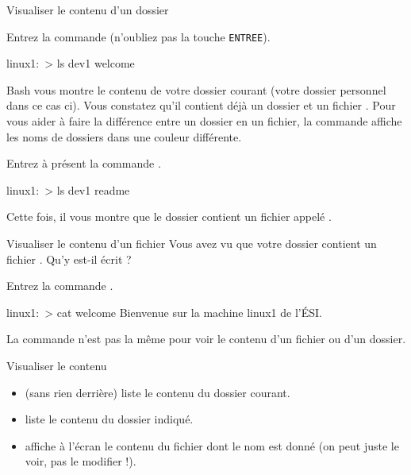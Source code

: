 \documentclass[a4paper,11pt]{style-esi/td}
\begin{document}
		\begin{Experience}{Visualiser le contenu d'un dossier}
			\vspace{-1em}
			\begin{steps}
			\item 
				Entrez la commande  (n'oubliez pas la touche \verb|ENTREE|).				
				\begin{Console}
					linux1:~> ls
					dev1 welcome
				\end{Console}				
				Bash vous montre le contenu de votre dossier courant
				(votre dossier personnel dans ce cas ci).
				Vous constatez qu'il contient déjà un dossier 
				et un fichier .
				Pour vous aider à faire la différence
				entre un dossier en un fichier, 
				la commande 
				affiche les noms de dossiers dans une couleur différente.
			\item 
				Entrez à présent la commande .
				\begin{Console}
					linux1:~> ls dev1
					readme
				\end{Console}				
				Cette fois, il vous montre que le dossier  contient
				un fichier appelé .
			\end{steps}			
		\end{Experience}

\newpage

		\begin{Experience}{Visualiser le contenu d'un fichier}
			Vous avez vu que votre dossier contient un fichier \samp{welcome}.
			Qu'y est-il écrit ?
			\begin{steps}
			\item 
				Entrez la commande \kbd{cat welcome}.
				\begin{Console}
					linux1:~> cat welcome
					Bienvenue sur la machine linux1 de l'ÉSI.
				\end{Console}
				La commande n'est pas la même pour voir le contenu d'un fichier
				ou d'un dossier.
			\end{steps}			
		\end{Experience}

		\bigskip
		\begin{theorie}{Visualiser le contenu}
			\begin{itemize}
			\item {}
				(sans rien derrière) liste le contenu du dossier courant.
			\item {}
				liste le contenu du dossier indiqué.
			\item {}
				affiche à l'écran le contenu du fichier dont le nom est donné 
				(on peut juste le voir, pas le modifier !).
			\end{itemize}
		\end{theorie}
	
\end{document}
